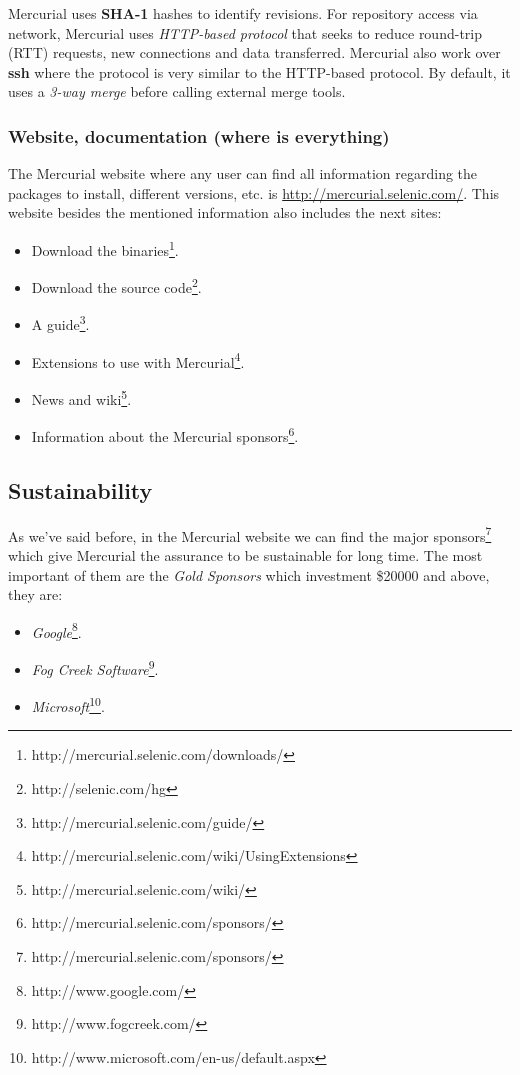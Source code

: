 \documentclass[a4paper,10pt]{article}
\begin{document}
Mercurial uses \textbf{SHA-1} hashes to identify revisions. For repository
access via network, Mercurial uses \textit{HTTP-based protocol} that seeks to
reduce round-trip (RTT) requests, new connections and data transferred.
Mercurial also work over \textbf{ssh} where the protocol is very similar to the
HTTP-based protocol.
By default, it uses a \textit{3-way merge}\cite{3-way merge} before calling
external merge tools.

\subsubsection{Website, documentation (where is everything)} \label{Website,
documentation (where is everything)}

The Mercurial website where any user can find all information regarding the
packages to install, different versions, etc. is
\url{http://mercurial.selenic.com/}.
This website besides the mentioned information also includes the next sites:
\begin{itemize}
 \item Download the binaries\footnote{http://mercurial.selenic.com/downloads/}.
 \item Download the source code\footnote{http://selenic.com/hg}.
 \item A guide\footnote{http://mercurial.selenic.com/guide/}.
 \item Extensions to use with
Mercurial\footnote{http://mercurial.selenic.com/wiki/UsingExtensions}.
 \item News and wiki\footnote{http://mercurial.selenic.com/wiki/}.
 \item Information about the Mercurial
sponsors\footnote{http://mercurial.selenic.com/sponsors/}.
\end{itemize}


\subsection{Sustainability} \label{Sustainability}

As we've said before, in the Mercurial website we can find the major
sponsors\footnote{http://mercurial.selenic.com/sponsors/} which give Mercurial
the assurance to be sustainable for long time.
The most important of them are the \textit{Gold Sponsors} which investment
\$20000 and above, they are:
\begin{itemize}
 \item \textit{Google}\footnote{http://www.google.com/}.
 \item \textit{Fog Creek Software}\footnote{http://www.fogcreek.com/}.
 \item
\textit{Microsoft}\footnote{http://www.microsoft.com/en-us/default.aspx}.
\end{itemize}
\end{document}
